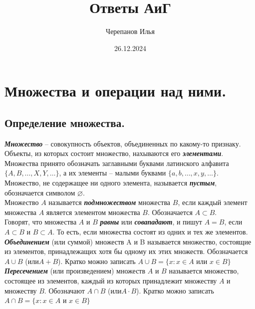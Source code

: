 \documentclass[12pt, fleqn]{article}
\title{Ответы АиГ}
\date{26.12.2024}
\author{Черепанов Илья}
\begin{document}
	\maketitle
	\clearpage
	\tableofcontents{}
	\clearpage
\section{Множества и операции над ними.}
\subsection*{Определение множества.}
\textbf{\textit{Множество}} -- совокупность объектов, объединенных по какому-то признаку.
\\
Объекты, из которых состоит множество, нахываются его \textbf{\textit{элементами}}.
\\
Множества принято обозначать заглавными буквами латинского алфавита $\{A,B,\dots ,X,Y,\dots \}$, а их элементы -- малыми буквами $\{a,b,\dots ,x,y,\dots \}$.
\\
Множество, не содержащее ни одного элемента, называется \textbf{\textit{пустым}}, обозначается символом $\varnothing$.
\\
Множество $A$ называется \textbf{\textit{подмножеством}} множества $B$, если каждый элемент множества $A$ является элементом множества $B$. Обозначается $A \subset B$.
\\
Говорят, что множества $A$ и $B$ \textbf{\textit{равны}} или \textbf{\textit{совападают}}, и пишут $A=B$, если $A \subset B$ и $B \subset A$. То есть, если множества состоят из одних и тех же элементов.
\\
\textbf{\textit{Объединением}} (или суммой) множеств A и B называется множество, состоящие из элементов, принадлежащих хотя бы одному их этих множеств. Обозначается $A \cup B$ (или$A+B$). Кратко можно записать $A\cup B = \{x\colon x\in A$ или $x \in B\}$
\\
\textbf{\textit{Пересечением}} (или произведением) множеств $A$ и $B$ называется множество, состоящее из элементов, каждый из которых принадлежит множеству $A$ и множеству $B$. Обозначают $A \cap B$ (или$A \cdot B$). Кратко можно записать $A\cap B = \{x\colon x\in A$ и $x \in B\}$
\end{document}
